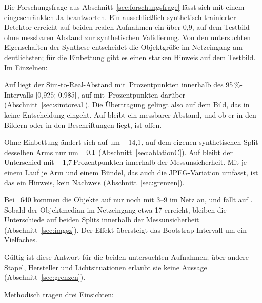  Die Forschungsfrage aus
Abschnitt~\ref{sec:forschungsfrage} lässt sich mit einem eingeschränkten Ja
beantworten. Ein ausschließlich synthetisch trainierter Detektor erreicht auf
beiden realen Aufnahmen ein \mAPfifty{} über 0,9, auf dem Testbild ohne
messbaren Abstand zur synthetischen Validierung. Von den untersuchten
Eigenschaften der Synthese entscheidet die Objektgröße im Netzeingang am
deutlichsten; für die Einbettung gibt es einen starken Hinweis auf dem
Testbild. Im Einzelnen:

\begin{description}[leftmargin=1.4em,itemsep=2pt,font=\normalfont\bfseries]
  \item[H1 Übertragung: auf \code{test} bestätigt, auf \code{val} nicht.] Auf
   liegt der Sim-to-Real-Abstand mit \zsimRealTest\,Prozentpunkten innerhalb
  des 95\,\%-Intervalls $[0{,}925;\,0{,}985]$, auf  mit
  \zsimRealVal\,Prozentpunkten darüber (Abschnitt~\ref{sec:simtoreal}). Die Übertragung
  gelingt also auf dem Bild, das in keine Entscheidung eingeht. Auf 
  bleibt ein messbarer Abstand, und ob er in den Bildern oder in den
  Beschriftungen liegt, ist offen.
  \item[H2 Einbettung: auf \code{test} gestützt, nicht nachgewiesen.] Ohne
  Einbettung ändert sich \mAPfifty{} auf  um $-14{,}1$\PP,
  auf dem eigenen synthetischen Split desselben Arms nur um
  $-0{,}1$\PP{} (Abschnitt~\ref{sec:ablationC}). Auf  bleibt
  der Unterschied mit $-1{,}7$\,Prozentpunkten innerhalb der Messunsicherheit. Mit
  je einem Lauf je Arm und einem Bündel, das auch die JPEG-Variation umfasst,
  ist das ein Hinweis, kein Nachweis (Abschnitt~\ref{sec:grenzen}).
  \item[H3 Objektgröße: bestätigt.] Bei ~640 kommen die Objekte
  auf  nur noch mit \mbox{3--9\px} im Netz an, und \mAPfifty{} fällt auf
  \zswValNiedrig. Sobald der Objektmedian im Netzeingang etwa 17\px{}
  erreicht, bleiben die Unterschiede auf beiden Splits innerhalb der
  Messunsicherheit (Abschnitt~\ref{sec:imgsz}). Der Effekt übersteigt das Bootstrap-Intervall
  um ein Vielfaches.
\end{description}

Gültig ist diese Antwort für die beiden untersuchten Aufnahmen; über andere
Stapel, Hersteller und Lichtsituationen erlaubt sie keine Aussage
(Abschnitt~\ref{sec:grenzen}).

Methodisch tragen drei Einsichten:

